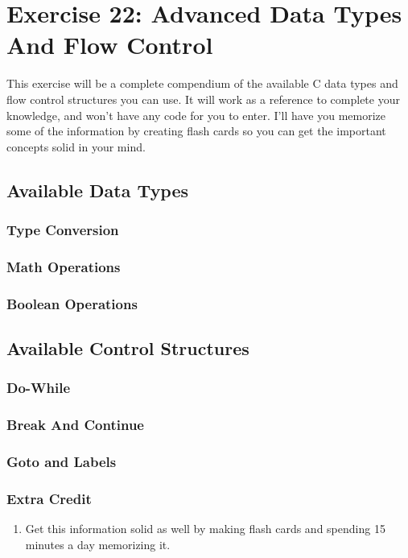 \chapter{Exercise 22: Advanced Data Types And Flow Control}

This exercise will be a complete compendium of the available C data types and
flow control structures you can use.  It will work as a reference to complete
your knowledge, and won't have any code for you to enter.  I'll have you
memorize some of the information by creating flash cards so you can get 
the important concepts solid in your mind.

\section{Available Data Types}


\subsection{Type Conversion}


\subsection{Math Operations}


\subsection{Boolean Operations}


\section{Available Control Structures}

\subsection{Do-While}

\subsection{Break And Continue}

\subsection{Goto and Labels}

\subsection{Extra Credit}

\begin{enumerate}
\item Get this information solid as well by making flash cards and spending 15 
    minutes a day memorizing it.
\end{enumerate}

